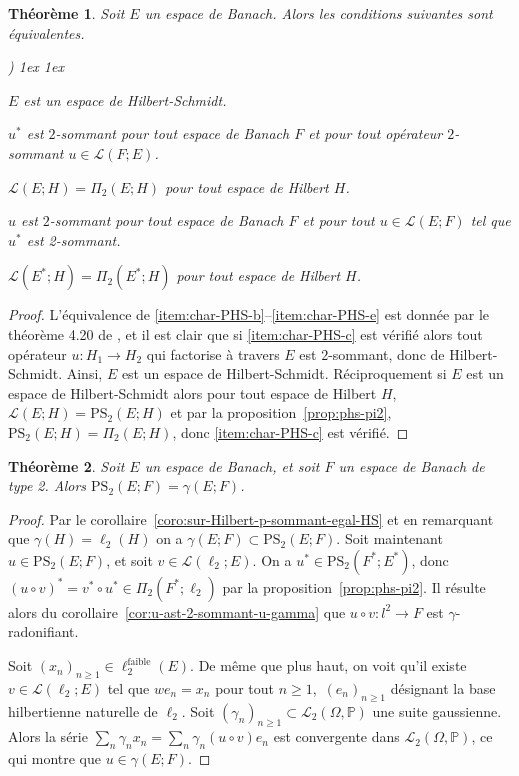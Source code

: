 \documentclass{smfart}
\theoremstyle{plain}
\newtheorem{theorem}{Théorème}[section]
\theoremstyle{definition}
\newcommand {\FAIBLE} {\text{faible}}
\newcommand {\ELL} {{\mathcal L}}
\newcommand {\BOUNDED} {{\mathcal L}}
\newcommand {\PHS} {\mathrm{PS}_2}
\newcounter{aufzi}
\newenvironment{aufzi}{\begin{list}{ {\upshape\alph{aufzi})}}{
        \usecounter{aufzi}
        \topsep1ex
        \parsep0cm
        \itemsep1ex
        \leftmargin0.8cm
        \labelwidth0.5cm
        \labelsep0.3cm
}}
{\end{list}}
\begin{document}
\begin{theorem}\label{thm:char-PHS}  Soit $E$ un espace de Banach. Alors les conditions
  suivantes sont équivalentes.
  \begin{aufzi}
\item \label{item:char-PHS-a} $E$ est un espace de Hilbert-Schmidt.
\item \label{item:char-PHS-b} $u^*$ est $2$-sommant pour tout espace de Banach $F$ et pour    tout opérateur $2$-sommant $u \in \BOUNDED(F; E)$.
\item \label{item:char-PHS-c} $\BOUNDED(E;H)=\Pi_2(E;H)$ pour tout espace de Hilbert $H$.
\item \label{item:char-PHS-d} $u$ est $2$-sommant pour tout espace de Banach $F$ et pour tout  $u\in \BOUNDED(E; F)$ tel que $u^*$ est 2-sommant.
\item \label{item:char-PHS-e} $\BOUNDED(E^*;H)=\Pi_2(E^*;H)$ pour tout espace de Hilbert $H$.
\end{aufzi}
\end{theorem}

\begin{proof} L'équivalence de
  \ref{item:char-PHS-b}--\ref{item:char-PHS-e} est donnée par le
  théorème 4.20 de \cite{DJT}, et il est clair que si
  \ref{item:char-PHS-c} est vérifié alors tout opérateur $u:H_1\to
  H_2$ qui factorise à travers $E$ est $2$-sommant, donc de
  Hilbert-Schmidt. Ainsi, $E$ est un espace de
  Hilbert-Schmidt. Réciproquement si $E$ est un espace de
  Hilbert-Schmidt alors pour tout espace de Hilbert $H$,
  $\BOUNDED(E;H) = {\PHS}(E;H)$ et par la
  proposition~\ref{prop:phs-pi2}, $\PHS(E;H) = \Pi_2(E;H)$, donc
  \ref{item:char-PHS-c} est vérifié.
\end{proof} 



\begin{theorem} 
  Soit $E$ un espace de Banach, et soit $F$ un espace de Banach de
  type 2. Alors $\PHS(E; F)=\gamma(E; F)$.
\end{theorem}
\begin{proof}
  Par le corollaire~\ref{coro:sur-Hilbert-p-sommant-egal-HS} et en
  remarquant que $\gamma(H) = \ell_2(H)$ on a $\gamma(E; F)\subset
  \PHS(E; F)$. Soit maintenant $u \in \PHS(E; F)$, et soit $v \in
  \BOUNDED(\ell_2;E)$. On a $u^*\in \PHS(F^*;E^*)$, donc $(u\circ
  v)^*=v^*\circ u^* \in \Pi_2(F^*;\ell_2)$ par la
  proposition~\ref{prop:phs-pi2}. Il résulte alors du
  corollaire~\ref{cor:u-ast-2-sommant-u-gamma} que $u\circ v: l^2 \to
  F$ est $\gamma$-radonifiant.

  \noindent Soit $(x_n)_{n\ge 1}\in \ell_2^{\FAIBLE}(E)$. De même que plus
  haut, on voit qu'il existe $v \in \BOUNDED(\ell_2;E)$ tel que
  $we_n=x_n$ pour tout $n\ge 1$, $\,(e_n)_{n\ge 1}$ désignant la base
  hilbertienne naturelle de $\ell_2$. Soit $(\gamma_n)_{n\ge 1}\subset
  \ELL_2(\Omega, {\mathbb P})$ une suite gaussienne. Alors la série $\sum
  _n \gamma_nx_n=\sum _n
  \gamma_n(u\circ v)e_n$ est convergente dans $\ELL_2(\Omega,{\mathbb
    P})$, ce qui montre que $u \in \gamma(E; F)$.
\end{proof}
\end{document}
